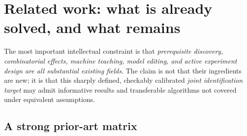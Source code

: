 \documentclass[11pt,a4paper]{article}
\theoremstyle{definition}\newtheorem{definition}[theorem]{Definition}
\theoremstyle{remark}\newtheorem{remark}[theorem]{Remark}
\begin{document}
\section{Related work: what is already solved, and what remains}\label{sec:rw}
The most important intellectual constraint is that \emph{prerequisite discovery, combinatorial effects, machine teaching, model editing, and active experiment design are all substantial existing fields}. The claim is not that their ingredients are new; it is that this sharply defined, checkably calibrated \emph{joint identification target} may admit informative results and transferable algorithms not covered under equivalent assumptions.

\subsection{A strong prior-art matrix}
\end{document}
